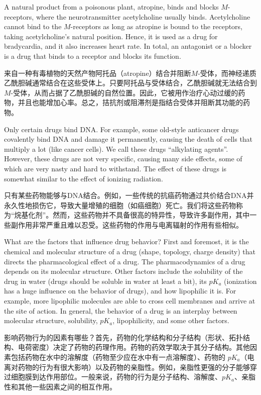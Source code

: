 \documentclass[dvipsnames, svgnames,a4paper,11pt]{article}
\begin{document}
A natural product from a poisonous plant, atropine, binds and blocks $M$-receptors, where the neurotransmitter acetylcholine usually binds. Acetylcholine cannot bind to the $M$-receptors as long as atropine is bound to the receptors, taking acetylcholine’s natural position. Hence, it is used as a drug for bradycardia, and it also increases heart rate. In total, an antagonist or a blocker is a drug that binds to a receptor and blocks its function.

来自一种有毒植物的天然产物阿托品（atropine）结合并阻断$M$-受体，而神经递质乙酰胆碱通常结合在这些受体上。只要阿托品与受体结合，乙酰胆碱就无法结合到$M$-受体，从而占据了乙酰胆碱的自然位置。因此，它被用作治疗心动过缓的药物，并且也能增加心率。总之，拮抗剂或阻滞剂是指结合受体并阻断其功能的药物。

Only certain drugs bind DNA. For example, some old-style anticancer drugs covalently bind DNA and damage it permanently, causing the death of cells that multiply a lot (like cancer cells). We call these drugs “alkylating agents”. However, these drugs are not very specific, causing many side effects, some of which are very nasty and hard to withstand. The effect of these drugs is somewhat similar to the effect of ionizing radiation.  

只有某些药物能够与DNA结合。例如，一些传统的抗癌药物通过共价结合DNA并永久性地损伤它，导致大量增殖的细胞（如癌细胞）死亡。我们将这些药物称为“烷基化剂”。然而，这些药物并不具备很高的特异性，导致许多副作用，其中一些副作用非常严重且难以忍受。这些药物的作用与电离辐射的作用有些相似。  

What are the factors that influence drug behavior? First and foremost, it is the chemical and molecular structure of a drug (shape, topology, charge density) that directs the pharmacological effect of a drug. The pharmacodynamics of a drug depends on its molecular structure. Other factors include the solubility of the drug in water (drugs should be soluble in water at least a bit), its $pK_a$ (ionization has a huge influence on the behavior of drugs), and how lipophilic it is. For example, more lipophilic molecules are able to cross cell membranes and arrive at the site of action. In general, the behavior of a drug is an interplay between molecular structure, solubility, $pK_a$, lipophilicity, and some other factors.

影响药物行为的因素有哪些？首先，药物的化学结构和分子结构（形状、拓扑结构、电荷密度）决定了药物的药理作用。药物的药效学取决于其分子结构。其他因素包括药物在水中的溶解度（药物至少应在水中有一点溶解度）、药物的 $pK_a$（电离对药物的行为有很大影响）以及药物的亲脂性。例如，亲脂性更强的分子能够穿过细胞膜到达作用部位。一般来说，药物的行为是分子结构、溶解度、$pK_a$、亲脂性和其他一些因素之间的相互作用。
\end{document}
